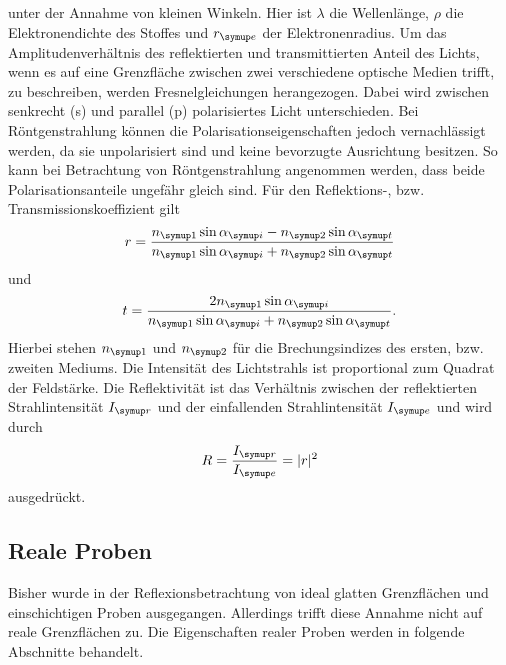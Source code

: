 unter der Annahme von kleinen Winkeln. Hier ist $\lambda$ die Wellenlänge, $\rho$ die Elektronendichte des Stoffes und 
$r\idx{e}$ der Elektronenradius.
Um das Amplitudenverhältnis des reflektierten und transmittierten Anteil des Lichts, wenn es auf eine Grenzfläche zwischen zwei 
verschiedene optische Medien trifft, zu beschreiben, 
werden Fresnelgleichungen herangezogen. Dabei wird zwischen senkrecht (s) und parallel (p) polarisiertes Licht unterschieden.
Bei Röntgenstrahlung können die Polarisationseigenschaften jedoch vernachlässigt werden, da sie unpolarisiert sind und keine bevorzugte 
Ausrichtung besitzen. So kann bei Betrachtung von Röntgenstrahlung angenommen werden, dass beide Polarisationsanteile ungefähr gleich sind.
Für den Reflektions-, bzw. Transmissionskoeffizient gilt
\begin{equation}
  r= \frac{n\idx{1} \sin \alpha\idx{i} - n\idx{2} \sin \alpha\idx{t}}{n\idx{1} \sin \alpha\idx{i} + n\idx{2} \sin \alpha\idx{t}}
\end{equation}
und
\begin{equation}
  t= \frac{2n\idx{1} \sin \alpha\idx{i}}{{n\idx{1} \sin \alpha\idx{i} + n\idx{2} \sin \alpha\idx{t}}}.
\end{equation}
Hierbei stehen $n\idx{1}$ und $n\idx{2}$ für die Brechungsindizes des ersten, bzw. zweiten Mediums.
Die Intensität des Lichtstrahls ist proportional zum Quadrat der Feldstärke. Die Reflektivität ist das Verhältnis 
zwischen der reflektierten Strahlintensität $I\idx{r}$ und der einfallenden Strahlintensität $I\idx{e}$ und wird durch 
\begin{equation*}
  R = \frac{I\idx{r}}{I\idx{e}} =|r|^2 
\end{equation*}
ausgedrückt.




\subsection{Reale Proben}
Bisher wurde in der Reflexionsbetrachtung von ideal glatten Grenzflächen und einschichtigen Proben ausgegangen. Allerdings trifft diese Annahme 
nicht auf reale Grenzflächen zu. Die Eigenschaften realer Proben werden in folgende Abschnitte behandelt.

